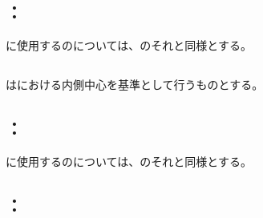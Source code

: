 \subsection{\indexTCOutcutMilling\nameToolCorrection：\EndFaceBoringMilling}
\EndFaceBoringMilling に使用する\indexTCSquareEndMill\nameSquareEndMill の\ToolCorrection については、\OutcutMilling のそれと同様とする。



\subsection{\IncutBoringMillingReferencePoint}
\IncutBoringMillingReferencePoint は\TopEndFace における内側中心を基準として行うものとする。


\subsection{\indexTCOutcutMilling\nameToolCorrection：\IncutBoringMilling}
\IncutBoringMilling に使用する\indexTCSquareEndMill\nameSquareEndMill の\ToolCorrection については、\OutcutMilling のそれと同様とする。


\clearpage


\subsection{\indexTCDimpleMilling\nameToolCorrection：\nameDimpleMilling}


